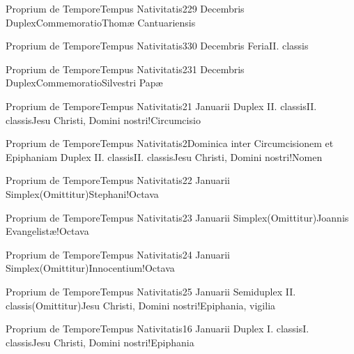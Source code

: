 \documentclass[invitatoriale-romanum.tex]{subfiles}
\begin{document}
	{Proprium de Tempore}{Tempus Nativitatis}{2}{29 Decembris}
	{Duplex}{Commemoratio}{Thomæ Cantuariensis}
	{}
	{}

	{Proprium de Tempore}{Tempus Nativitatis}{3}{30 Decembris}
	{Feria}{II. classis}{}
	{}
	{}

	{Proprium de Tempore}{Tempus Nativitatis}{2}{31 Decembris}
	{Duplex}{Commemoratio}{Silvestri Papæ}
	{}
	{}

	{Proprium de Tempore}{Tempus Nativitatis}{2}{1 Januarii}
	{Duplex II. classis}{II. classis}{Jesu Christi, Domini nostri!Circumcisio}
	{}
	{}

	{Proprium de Tempore}{Tempus Nativitatis}{2}{Dominica inter Circumcisionem et Epiphaniam}
	{Duplex II. classis}{II. classis}{Jesu Christi, Domini nostri!Nomen}
	{}
	{}

	{Proprium de Tempore}{Tempus Nativitatis}{2}{2 Januarii}
	{Simplex}{(Omittitur)}{Stephani!Octava}
	{}
	{}

	{Proprium de Tempore}{Tempus Nativitatis}{2}{3 Januarii}
	{Simplex}{(Omittitur)}{Joannis Evangelistæ!Octava}
	{}
	{}

	{Proprium de Tempore}{Tempus Nativitatis}{2}{4 Januarii}
	{Simplex}{(Omittitur)}{Innocentium!Octava}
	{}
	{}

	{Proprium de Tempore}{Tempus Nativitatis}{2}{5 Januarii}
	{Semiduplex II. classis}{(Omittitur)}{Jesu Christi, Domini nostri!Epiphania, vigilia}
	{}
	{}

\pagebreak

	{Proprium de Tempore}{Tempus Nativitatis}{1}{6 Januarii}
	{Duplex I. classis}{I. classis}{Jesu Christi, Domini nostri!Epiphania}
	{}
	{}
\end{document}
